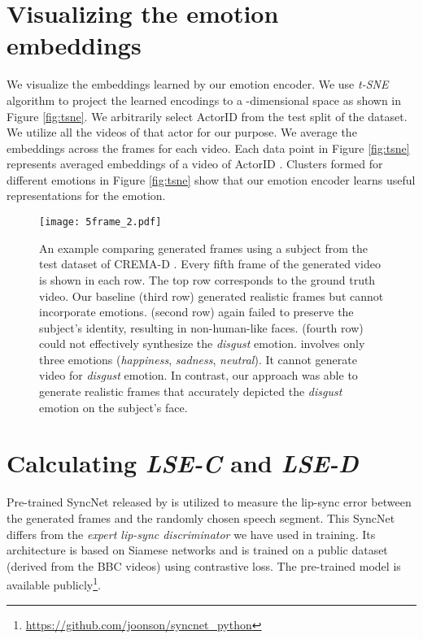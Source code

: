 \documentclass[accepted]{uai2023}
\begin{document}
\section{Visualizing the emotion embeddings}
We visualize the embeddings learned by our emotion encoder. We use \emph{t-SNE} \citep{van2008visualizing} algorithm to project the learned encodings to a -dimensional space as shown in Figure \ref{fig:tsne}. We arbitrarily select ActorID  from the test split of the \citep{cao2014crema} dataset. We utilize all the videos of that actor for our purpose. We average the embeddings across the frames for each video. Each data point in Figure \ref{fig:tsne} represents averaged embeddings of a video of ActorID . Clusters formed for different emotions in Figure \ref{fig:tsne} show that our emotion encoder learns useful representations for the emotion.

\begin{figure*}[htp]
\texttt{[image: 5frame\_2.pdf]}
\caption{An example comparing generated frames using a subject from the test dataset of CREMA-D \citep{cao2014crema}. Every fifth frame of the generated video is shown in each row. The top row corresponds to the ground truth video. Our baseline \citep{prajwal2020lip} (third row) generated realistic frames but cannot incorporate emotions. \citet{wang2021audio2head} (second row) again failed to preserve the subject's identity, resulting in non-human-like faces. \cite{9496264} (fourth row) could not effectively synthesize the \emph{disgust} emotion. \citet{magnusson2021invertable} involves only three emotions (\emph{happiness}, \emph{sadness}, \emph{neutral}). It cannot generate video for \emph{disgust} emotion.
In contrast, our approach {} was able to generate realistic frames that accurately depicted the \emph{disgust} emotion on the subject's face.}
\label{fig:cmp2}
\end{figure*}

\section{Calculating \emph{LSE-C} and \emph{LSE-D}}
Pre-trained SyncNet released by \citep{chung2016out} is utilized to measure the lip-sync error between the generated frames and the randomly chosen speech segment. This SyncNet differs from the \emph{expert lip-sync discriminator} we have used in training. Its architecture is based on Siamese networks \citep{1467314} and is trained on a public dataset (derived from the BBC videos) using contrastive loss. The pre-trained model is available publicly\footnote{\href{https://github.com/joonson/syncnet_python}{https://github.com/joonson/syncnet\_python}}.
\end{document}
